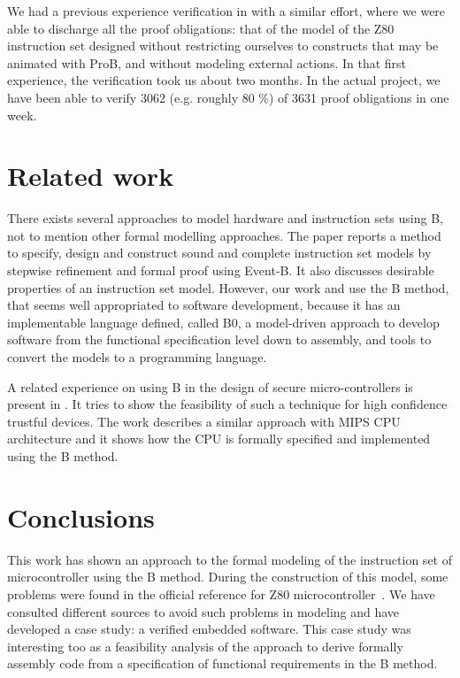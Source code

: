 \documentclass[a4paper]{llncs}
\begin{document}
We had a previous experience verification in \cite{Valerio_SBMF09} with
a similar effort, where we were able to discharge all the proof obligations: 
that of the model of the Z80 instruction set designed without restricting
ourselves to constructs that may be animated with ProB, and without
modeling external actions. In that first experience, the verification took us about two
months. In the actual project, we have been able to verify 3062
(e.g. roughly 80 \%) of 3631 proof obligations in one week.



\section{Related work}
\label{sec:relatedworks}

There exists several approaches to model hardware and instruction sets
using B, not to mention other formal modelling approaches.  The paper
\cite{springerlink:Yuan2011} reports a method to specify, design and
construct sound and complete instruction set models by stepwise
refinement and formal proof using Event-B. It also discusses desirable
properties of an instruction set model. However, our work
\cite{Valerio_SBMF09} and \cite{Subotic2010} use the B method, that
seems well appropriated to software development, because it has an
implementable language defined, called B0, a model-driven approach
\cite{Dantas_SBMF08} to develop software from the functional
specification level down to assembly, and tools to convert the models
to a programming language.

A related experience on using B in the design of secure
micro-controllers is present in \cite{Marc20113}. It tries to show the
feasibility of such a technique for high confidence trustful
devices. The work \cite{Subotic2010} describes a similar approach with
MIPS CPU architecture and it shows how the CPU is formally specified
and implemented using the B method.




 
\section{Conclusions}
\label{sec:conclusions} 

This work has shown an approach to the formal modeling of the
instruction set of microcontroller using the B method.  During the
construction of this model, some problems were found in the official
reference for Z80 microcontroller~\cite{Z80_manual}. We have consulted
different sources \cite{Simulator_z80,Z80_manual} to
avoid such problems in modeling and have developed a case study: a
verified embedded software.  This case study was interesting too as a
feasibility analysis of the approach to derive formally assembly code
from a specification of functional requirements in the B method.
\end{document}
